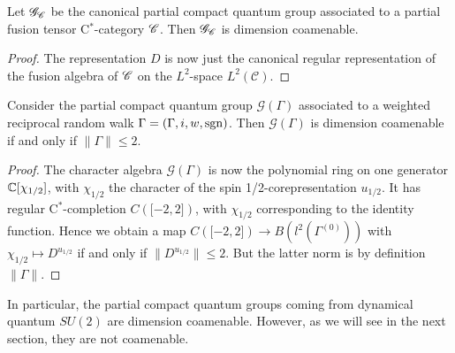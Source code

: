 \begin{Prop} Let $\mathscr{G}_{\mathscr{C}}$ be the canonical partial compact quantum group associated to a partial fusion tensor C$^*$-category $\mathscr{C}$. Then $\mathscr{G}_{\mathscr{C}}$ is dimension coamenable.  
\end{Prop}%
\begin{proof} The representation $D$ is now just the canonical regular representation of the fusion algebra of $\mathscr{C}$ on the $L^2$-space $L^2(\mathcal{C})$. 
 \end{proof}
 
 \begin{Prop} Consider the partial compact quantum group $\mathscr{G}(\Gamma)$ associated to a weighted reciprocal random walk $\Gamma = (\Gamma,i,w,\operatorname{\mathrm{sgn}})$. Then $\mathscr{G}(\Gamma)$ is dimension coamenable if and only if $\|\Gamma\| \leq 2$. 
 \end{Prop}%
 \begin{proof}
 The character algebra $\mathscr{G}(\Gamma)$ is now the polynomial ring on one generator $\mathbb{C}\lbrack \chi_{1/2}\rbrack$, with $\chi_{1/2}$ the character of the spin 1/2-corepresentation $u_{1/2}$. It has regular C$^*$-completion $C(\lbrack -2,2\rbrack)$, with $\chi_{1/2}$ corresponding to the identity function. Hence we obtain a map $C(\lbrack -2,2\rbrack) \rightarrow B(l^2(\Gamma^{(0)}))$ with $\chi_{1/2}\mapsto D^{u_{1/2}}$ if and only if $\|D^{u_{1/2}}\| \leq  2$. But the latter norm is by definition $\|\Gamma\|$.   
 \end{proof} 
 
 In particular, the partial compact quantum groups coming from dynamical quantum $SU(2)$ are dimension coamenable. However, as we will see in the next section, they are not coamenable.